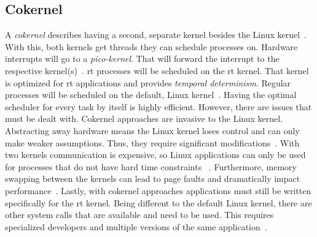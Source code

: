 \documentclass[10pt,twocolumn,a4paper]{article}
\begin{document}
\subsection{Cokernel}
A \emph{cokernel} describes having a second, separate kernel besides the Linux kernel~\cite{reghenzani_realtime_2019}.
With this, both kernels get threads they can schedule processes on.
Hardware interrupts will go to a \emph{pico-kernel}.
That will forward the interrupt to the respective kernel(s)~\cite{reghenzani_realtime_2019}.
\acrshort{rt} processes will be scheduled on the \acrshort{rt} kernel.
That kernel is optimized for \acrshort{rt} applications and provides \emph{temporal determinism}.
Regular processes will be scheduled on the default, Linux kernel~\cite{reghenzani_realtime_2019}.
Having the optimal scheduler for every task by itself is highly efficient.
However, there are issues that must be dealt with.
Cokernel approaches are invasive to the Linux kernel.
Abstracting away hardware means the Linux kernel loses control and can only make weaker assumptions.
Thus, they require significant modifications~\cite{reghenzani_realtime_2019}.
With two kernels communication is expensive, so Linux applications can only be used for processes that do not have hard time constraints ~\cite{reghenzani_realtime_2019}.
Furthermore, memory swapping between the kernels can lead to page faults and dramatically impact performance~\cite{reghenzani_realtime_2019}.
Lastly, with cokernel approaches applications must still be written specifically for the \acrshort{rt} kernel.
Being different to the default Linux kernel, there are other system calls that are available and need to be used.
This requires specialized developers and multiple versions of the same application~\cite{reghenzani_realtime_2019}.
\end{document}
